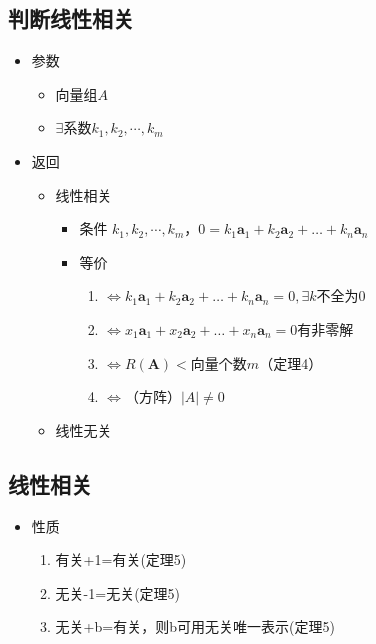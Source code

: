 \documentclass[UTF8,a4paper,12pt,scheme=chinese]{ctexbook}
\begin{document}
	\subsection{判断线性相关}
	\begin{itemize}
		\item 参数
		\begin{itemize}
			\item 向量组$A$
			\item $\exists$系数$k_1,k_2,\dotsb,k_m$
		\end{itemize}
		\item 返回
		\begin{itemize}
			\item 线性相关
			\begin{itemize}
				\item 条件
				\subitem $k_1,k_2,\dotsb,k_m$，$0=k_1\boldsymbol{a}_1+k_2\boldsymbol{a}_2+\dots+k_n\boldsymbol{a}_n$
				\item 等价
				\begin{enumerate}
					\item $\Leftrightarrow k_1\boldsymbol{a}_1+k_2\boldsymbol{a}_2+\dots+k_n\boldsymbol{a}_n=0,\exists k$不全为0
					\item$\Leftrightarrow x_1\boldsymbol{a}_1+x_2\boldsymbol{a}_2+\dots+x_n\boldsymbol{a}_n=0$有非零解
					\item$\Leftrightarrow R(\boldsymbol{A})<$向量个数$m$（定理4）
					\item$\Leftrightarrow$（方阵）$|A|\ne 0$
				\end{enumerate}
			\end{itemize}
			\item 线性无关
		\end{itemize}
	\end{itemize}
	\subsection{线性相关}
	\begin{itemize}
		\item 性质
		\begin{enumerate}
			\item 有关+1=有关(定理5)
			\item 无关-1=无关(定理5)
			\item 无关+b=有关，则b可用无关唯一表示(定理5)
		\end{enumerate}
	\end{itemize}
\end{document}
